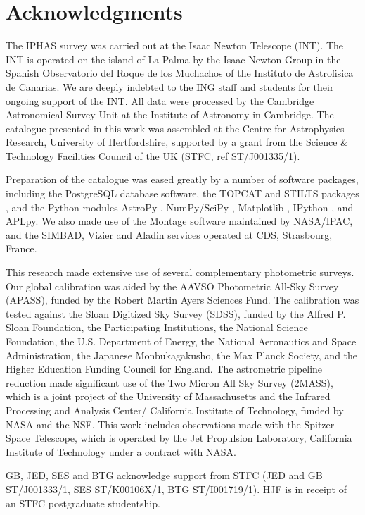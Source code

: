 \documentclass[useAMS,usenatbib]{mn2e}
\begin{document}
\section*{Acknowledgments}

The IPHAS survey was carried out 
at the Isaac Newton Telescope (INT).
The INT is operated on the island of La Palma
by the Isaac Newton Group
in the Spanish Observatorio del Roque de los Muchachos
of the Instituto de Astrofisica de Canarias.
We are deeply indebted to the ING staff and students
for their ongoing support of the INT.
All data were processed 
by the Cambridge Astronomical Survey Unit
at the Institute of Astronomy in Cambridge.
The catalogue presented in this work was assembled
at the Centre for Astrophysics Research, University of Hertfordshire, supported by a grant from the Science \& Technology Facilities Council
of the UK (STFC, ref ST/J001335/1).

Preparation of the catalogue was eased greatly
by a number of software packages,
including the PostgreSQL database software,
the TOPCAT and STILTS packages \citep{Taylor2005,Taylor2006},
and the Python modules
AstroPy \citep{Astropy},
NumPy/SciPy \citep{Numpy},
Matplotlib \citep{Matplotlib},
IPython \citep{IPython},
and APLpy.
We also made use of the Montage software maintained by NASA/IPAC,
and the SIMBAD, Vizier and Aladin \citep{Aladin} services
operated at CDS, Strasbourg, France.

This research made extensive use of
several complementary photometric surveys.
Our global calibration was aided
by the AAVSO Photometric All-Sky Survey (APASS),
funded by the Robert Martin Ayers Sciences Fund.
The calibration was tested against the
Sloan Digitized Sky Survey (SDSS),
funded by the Alfred P. Sloan Foundation,
the Participating Institutions,
the National Science Foundation,
the U.S. Department of Energy,
the National Aeronautics and Space Administration,
the Japanese Monbukagakusho, the Max Planck Society,
and the Higher Education Funding Council for England.
The astrometric pipeline reduction made
significant use of the Two Micron All Sky Survey (2MASS),
which is a joint project 
of the University of Massachusetts
and the Infrared Processing and Analysis Center/
California Institute of Technology,
funded by NASA and the NSF.
This work includes observations made
with the Spitzer Space Telescope,
which is operated by the Jet Propulsion Laboratory,
California Institute of Technology under a contract with NASA. 

GB, JED, SES and BTG acknowledge support from STFC
(JED and GB ST/J001333/1, SES ST/K00106X/1, BTG ST/I001719/1). 
HJF is in receipt of an STFC postgraduate studentship.
\end{document}
